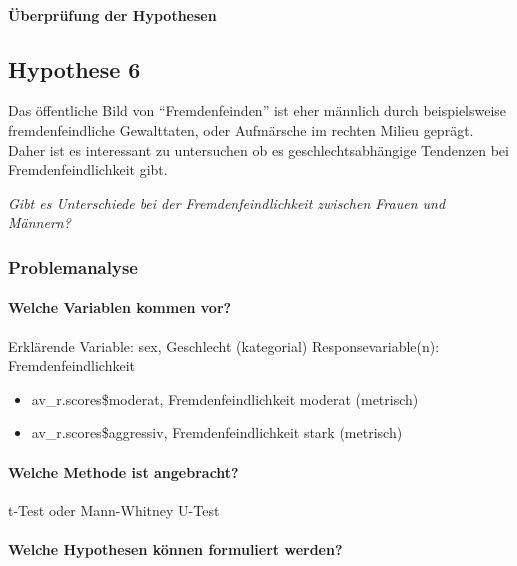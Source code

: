 \documentclass[]{article}
\providecommand{\tightlist}{%
  \setlength{\itemsep}{0pt}\setlength{\parskip}{0pt}}
\let\oldparagraph\paragraph
\renewcommand{\paragraph}[1]{\oldparagraph{#1}\mbox{}}
\begin{document}
\paragraph{Überprüfung der
Hypothesen}\label{uberprufung-der-hypothesen-2}

\subsection{Hypothese 6}\label{hypothese-6}

Das öffentliche Bild von ``Fremdenfeinden'' ist eher männlich durch
beispielsweise fremdenfeindliche Gewalttaten, oder Aufmärsche im rechten
Milieu geprägt. Daher ist es interessant zu untersuchen ob es
geschlechtsabhängige Tendenzen bei Fremdenfeindlichkeit gibt.

\emph{Gibt es Unterschiede bei der Fremdenfeindlichkeit zwischen Frauen
und Männern?}

\subsubsection{Problemanalyse}\label{problemanalyse-3}

\paragraph{Welche Variablen kommen
vor?}\label{welche-variablen-kommen-vor-3}

Erklärende Variable: sex, Geschlecht (kategorial) Responsevariable(n):
Fremdenfeindlichkeit

\begin{itemize}
\tightlist
\item
  av\_r.scores\$moderat, Fremdenfeindlichkeit moderat (metrisch)
\item
  av\_r.scores\$aggressiv, Fremdenfeindlichkeit stark (metrisch)
\end{itemize}

\paragraph{Welche Methode ist
angebracht?}\label{welche-methode-ist-angebracht-3}

t-Test oder Mann-Whitney U-Test

\paragraph{Welche Hypothesen können formuliert
werden?}\label{welche-hypothesen-konnen-formuliert-werden-3}
\end{document}

